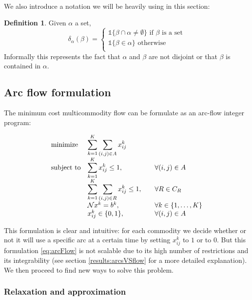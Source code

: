 \documentclass[14pt,a4paper]{article}
\theoremstyle{definition}
\newtheorem{madef}{Definition}[section]
\numberwithin{equation}{subsection}
\begin{document}
We also introduce a notation we will be heavily using in this section:
\begin{madef}
	Given $\alpha$ a set,
	\[
	\delta_\alpha(\beta)=\left\{
	\begin{array}{ll}
	 \mathds{1}{\{\beta \cap \alpha \neq \emptyset\}} \text{ if } \beta \text{ is a set}\\
	\mathds{1}{\{\beta \in \alpha\}} \text{ otherwise}\\
	\end{array}
	\right.
	\]
	Informally this represents the fact that $\alpha$ and $\beta$ are not disjoint or that $\beta$ is contained in $\alpha$.

\end{madef}


\subsection{Arc flow formulation}

The minimum cost multicommodity flow can be formulate as an arc-flow integer program: 

\begin{equation}
\begin{array}{ll@{}ll}
\text{minimize}  & \displaystyle\sum\limits_{k=1}^{K}\sum_{(i,j)\in A} x_{ij}^k &\\
\text{subject to}& \displaystyle\sum\limits_{k=1}^{K}   x_{ij}^k \leq 1,  &\forall (i,j) \in A \\
& \displaystyle\sum\limits_{k=1}^{K}\sum_{(i,j) \in R}   x_{ij}^k \leq 1, \quad \quad  &\forall R \in C_R \\
& \mathcal{N}x^k = b^k,  &\forall k \in \{1,\ldots,K\}\\
&                                                x_{ij}^k \in \{0,1\}, & \forall (i,j)\in A
\end{array}
\label{eq:arcFlow}
\end{equation}


This formulation is clear and intuitive: for each commodity we decide whether or not it will use a specific arc at a certain time by setting $x_{ij}^k$ to $1$ or to $0$. But this formulation \eqref{eq:arcFlow} is not scalable due to its high number of restrictions and its integrability (see section \ref*{results:arcsVSflow} for a more detailed explanation). We then proceed to find new ways to solve this problem.


\subsubsection{Relaxation and approximation}
\end{document}
